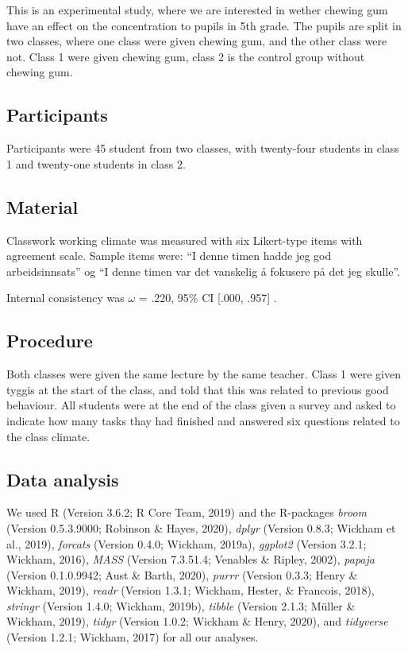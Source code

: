 \documentclass[english,man]{apa6}
\begin{document}
This is an experimental study, where we are interested in wether chewing gum have an effect on the concentration to pupils in 5th grade.
The pupils are split in two classes, where one class were given chewing gum, and the other class were not.
Class 1 were given chewing gum, class 2 is the control group without chewing gum.

\hypertarget{participants}{%
\subsection{Participants}\label{participants}}

Participants were 45 student from two classes, with twenty-four students in class 1 and twenty-one students in class 2.

\hypertarget{material}{%
\subsection{Material}\label{material}}

Classwork working climate was measured with six Likert-type items with agreement scale.
Sample items were: \enquote{I denne timen hadde jeg god arbeidsinnsats} og \enquote{I denne timen var det vanskelig å fokusere på det jeg skulle}.

Internal consistency was \(\omega\) = .220, 95\% CI {[}.000, .957{]} .

\hypertarget{procedure}{%
\subsection{Procedure}\label{procedure}}

Both classes were given the same lecture by the same teacher.
Class 1 were given tyggis at the start of the class, and told that this was related to previous good behaviour.
All students were at the end of the class given a survey and asked to indicate how many tasks thay had finished and answered six questions related to the class climate.

\hypertarget{data-analysis}{%
\subsection{Data analysis}\label{data-analysis}}

We used R (Version 3.6.2; R Core Team, 2019) and the R-packages \emph{broom} (Version 0.5.3.9000; Robinson \& Hayes, 2020), \emph{dplyr} (Version 0.8.3; Wickham et al., 2019), \emph{forcats} (Version 0.4.0; Wickham, 2019a), \emph{ggplot2} (Version 3.2.1; Wickham, 2016), \emph{MASS} (Version 7.3.51.4; Venables \& Ripley, 2002), \emph{papaja} (Version 0.1.0.9942; Aust \& Barth, 2020), \emph{purrr} (Version 0.3.3; Henry \& Wickham, 2019), \emph{readr} (Version 1.3.1; Wickham, Hester, \& Francois, 2018), \emph{stringr} (Version 1.4.0; Wickham, 2019b), \emph{tibble} (Version 2.1.3; Müller \& Wickham, 2019), \emph{tidyr} (Version 1.0.2; Wickham \& Henry, 2020), and \emph{tidyverse} (Version 1.2.1; Wickham, 2017) for all our analyses.
\end{document}
